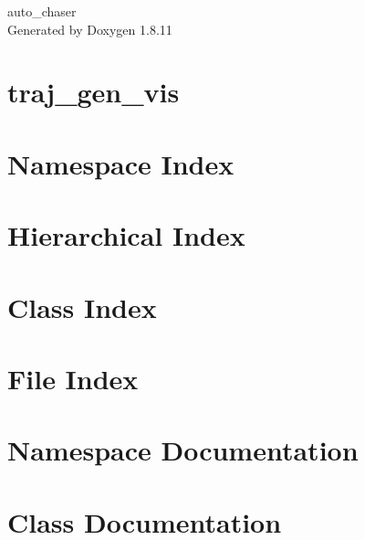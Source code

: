 \documentclass[twoside]{book}
\newcommand{\+}{\discretionary{\mbox{\scriptsize$\hookleftarrow$}}{}{}}
\newcommand{\clearemptydoublepage}{%
  \newpage{\pagestyle{empty}\cleardoublepage}%
}
\begin{document}
\hypersetup{pageanchor=false,
             bookmarksnumbered=true,
             pdfencoding=unicode
            }
\begin{titlepage}
\vspace*{7cm}
\begin{center}%
{\Large auto\+\_\+chaser }\\
\vspace*{1cm}
{\large Generated by Doxygen 1.8.11}\\
\end{center}
\end{titlepage}
\clearemptydoublepage
\tableofcontents
\clearemptydoublepage
{}
\hypersetup{pageanchor=true}

\chapter{traj\+\_\+gen\+\_\+vis}
\label{md_README}
\hypertarget{md_README}{}

\chapter{Namespace Index}

\chapter{Hierarchical Index}

\chapter{Class Index}

\chapter{File Index}

\chapter{Namespace Documentation}





\chapter{Class Documentation}

















\end{document}
